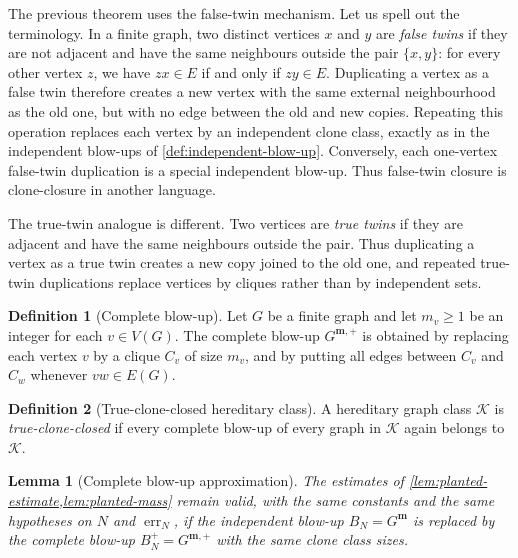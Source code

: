 \documentclass[11pt]{article}
\newtheorem{lemma}[lemma]{Lemma}
\theoremstyle{definition}
\newtheorem{definition}[definition]{Definition}
\newcommand{\K}{\mathcal{K}}
\begin{document}
The previous theorem uses the false-twin mechanism.  Let us spell out the
terminology.  In a finite graph, two distinct vertices $x$ and $y$ are
\emph{false twins} if they are not adjacent and have the same neighbours outside
the pair $\{x,y\}$: for every other vertex $z$, we have $zx\in E$ if and only
if $zy\in E$.  Duplicating a vertex as a false twin therefore creates a new
vertex with the same external neighbourhood as the old one, but with no edge
between the old and new copies.  Repeating this operation replaces each vertex
by an independent clone class, exactly as in the independent blow-ups of
\cref{def:independent-blow-up}.  Conversely, each one-vertex false-twin
duplication is a special independent blow-up.  Thus false-twin closure is
clone-closure in another language.

The true-twin analogue is different.  Two vertices are \emph{true twins} if
they are adjacent and have the same neighbours outside the pair.  Thus
duplicating a vertex as a true twin creates a new copy joined to the old one,
and repeated true-twin duplications replace vertices by cliques rather than by
independent sets.

\begin{definition}[Complete blow-up]\label{def:complete-blow-up}
Let $G$ be a finite graph and let $m_v\ge1$ be an integer for each
$v\in V(G)$.  The complete blow-up $G^{\mathbf m,+}$ is obtained by replacing
each vertex $v$ by a clique $C_v$ of size $m_v$, and by putting all edges
between $C_v$ and $C_w$ whenever $vw\in E(G)$.
\end{definition}

\begin{definition}[True-clone-closed hereditary class]
A hereditary graph class $\K$ is \emph{true-clone-closed} if every complete
blow-up of every graph in $\K$ again belongs to $\K$.
\end{definition}

\begin{lemma}[Complete blow-up approximation]\label{lem:true-planted-estimate}
The estimates of \cref{lem:planted-estimate,lem:planted-mass} remain valid,
with the same constants and the same hypotheses on $N$ and $\operatorname{err}_N$,
if the independent blow-up $B_N=G^{\mathbf m}$ is replaced by the complete
blow-up $B_N^+=G^{\mathbf m,+}$ with the same clone class sizes.
\end{lemma}
\end{document}
